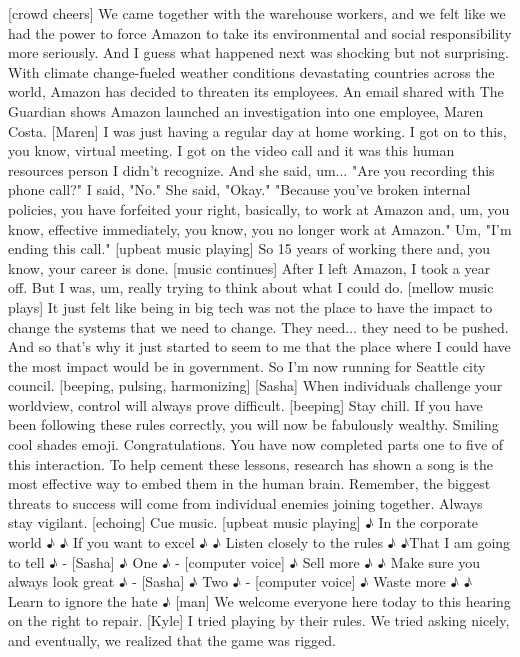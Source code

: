 \documentclass[a4paper]{article}
\begin{document}
	[crowd cheers]
	We came together with the warehouse workers,
	and we felt like we had the power to force Amazon
	to take its environmental and social responsibility more seriously.
	And I guess what happened next was shocking
	but not surprising.
	With climate change-fueled weather conditions
	devastating countries across the world,
	Amazon has decided to threaten its employees.
	An email shared with The Guardian shows Amazon launched an investigation
	into one employee, Maren Costa.
	[Maren] I was just having a regular day at home working.
	I got on to this, you know, virtual meeting.
	I got on the video call
	and it was this human resources person
	I didn't recognize.
	And she said, um...
	"Are you recording this phone call?"
	I said, "No." She said, "Okay."
	"Because you've broken internal policies, you have forfeited your right,
	basically, to work at Amazon
	and, um, you know, effective immediately,
	you know, you no longer work at Amazon."
	Um, "I'm ending this call."
	[upbeat music playing]
	So 15 years of working there and, you know, your career is done.
	[music continues]
	After I left Amazon, I took a year off.
	But I was, um, really trying to think about what I could do.
	[mellow music plays]
	It just felt like
	being in big tech
	was not the place to have the impact to change the systems
	that we need to change.
	They need... they need to be pushed.
	And so that's why
	it just started to seem to me that
	the place where I could have the most impact would be in government.
	So I'm now running for Seattle city council.
	[beeping, pulsing, harmonizing]
	[Sasha] When individuals challenge your worldview,
	control will always prove difficult.
	[beeping]
	Stay chill.
	If you have been following these rules correctly,
	you will now be fabulously wealthy.
	Smiling cool shades emoji.
	Congratulations.
	You have now completed parts
	one to five of this interaction.
	To help cement these lessons,
	research has shown a song is the most effective way
	to embed them in the human brain.
	Remember, the biggest threats to success
	will come from individual enemies joining together.
	Always stay vigilant. [echoing]
	Cue music.
	[upbeat music playing]
	♪ In the corporate world ♪
	♪ If you want to excel ♪
	♪ Listen closely to the rules ♪
	♪That I am going to tell ♪
	- [Sasha] ♪ One ♪ - [computer voice] ♪ Sell more ♪
	♪ Make sure you always look great ♪
	- [Sasha] ♪ Two ♪ - [computer voice] ♪ Waste more ♪
	♪ Learn to ignore the hate ♪
	[man] We welcome everyone here today to this hearing
	on the right to repair.
	[Kyle] I tried playing by their rules.
	We tried asking nicely, and eventually, we realized that the game was rigged.
\end{document}
